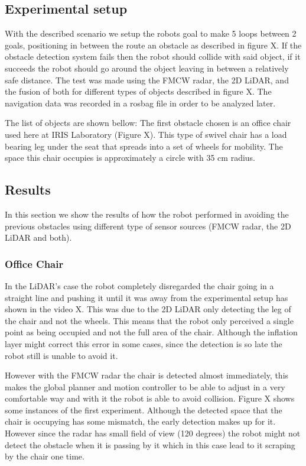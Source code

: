 \subsection{Experimental setup}
With the described scenario we setup the robots goal to make 5 loops between 2 goals, positioning in between the route an obstacle as described in  figure X. If the obstacle detection system fails then the robot should collide with said object, if it succeeds the robot should go around the object leaving in between a relatively safe distance. The test was made using the \ac{FMCW} radar, the 2D \ac{LiDAR}, and the fusion of both for different types of objects described in figure X. The  navigation data was recorded in a rosbag file in order to be analyzed later.

The list of objects are shown bellow:
The first obstacle chosen is an office chair used here at \ac{IRIS} Laboratory (Figure X). This type of swivel chair has a load bearing leg under the seat  that  spreads into a set of wheels for mobility. The space this chair occupies is approximately a circle with 35 cm radius.
\subsection{Results}
In this section we show the results of how the robot performed in avoiding the previous obstacles using different type of sensor sources (\ac{FMCW} radar, the 2D \ac{LiDAR} and both).
\subsubsection{Office Chair}
In the \ac{LiDAR}'s case  the robot completely disregarded the chair going in a straight line and pushing it until it was away from the experimental setup has shown in the video X. This was due to the 2D \ac{LiDAR} only detecting the leg of the chair and not the wheels. This means that the robot only perceived a single point as being occupied and not the full area of the chair. Although the inflation layer  might correct this error in some cases, since the detection is so late the robot still is unable to avoid it.

However with the \ac{FMCW} radar the chair is detected almost immediately, this makes the global planner and motion controller to be able to adjust in a very comfortable way and with it the robot is able to avoid collision. Figure X shows some instances of the first experiment. Although the detected space that the chair is occupying has some mismatch, the early detection makes up for it. However since the radar has small field of view (120 degrees) the robot might not detect the obstacle when it is passing by it which in this case lead to it scraping by the chair one time.
